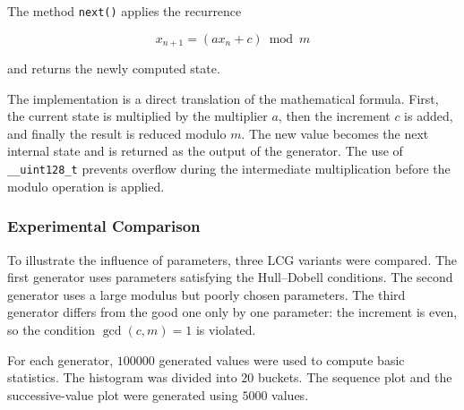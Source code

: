 The method \texttt{next()} applies the recurrence

\[
x_{n+1} = (a x_n + c) \bmod m
\]

and returns the newly computed state.


The implementation is a direct translation of the mathematical formula. First, the current state is multiplied by the multiplier $a$, then the increment $c$ is added, and finally the result is reduced modulo $m$. The new value becomes the next internal state and is returned as the output of the generator. The use of \texttt{\_\_uint128\_t} prevents overflow during the intermediate multiplication before the modulo operation is applied.

\subsubsection{Experimental Comparison}

To illustrate the influence of parameters, three LCG variants were compared. The first generator uses parameters satisfying the Hull--Dobell conditions. The second generator uses a large modulus but poorly chosen parameters. The third generator differs from the good one only by one parameter: the increment is even, so the condition $\gcd(c,m)=1$ is violated.

\begin{table}[htbp]
\centering
\small
{}
\caption{LCG parameter sets used in the experiment}
\label{tab:lcg-parameters}
\end{table}

For each generator, $100000$ generated values were used to compute basic statistics. The histogram was divided into $20$ buckets. The sequence plot and the successive-value plot were generated using $5000$ values.


